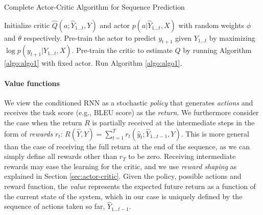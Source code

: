 \documentclass{article} %
\begin{document}
\begin{algorithm}
    \caption{Complete Actor-Critic Algorithm for Sequence Prediction}
    \label{algo:algo2}
    \begin{algorithmic}[1]
    \STATE 
        Initialize critic $\hat{Q}(a;\hat{Y}_{1 \ldots t}, Y)$
        and actor $p(a|\hat{Y}_{1 \ldots t}, X)$ with
        random weights $\phi$ and $\theta$ respectively.
    \STATE 
        Pre-train the actor to predict $y_{t+1}$ given 
        $Y_{1 \ldots t}$ by maximizing 
        $\log p(y_{t+1}|Y_{1 \ldots t}, X)$.
    \STATE 
        Pre-train the critic to estimate $Q$ by running Algorithm \ref{algo:algo1}
        with fixed actor.
    \STATE
        Run Algorithm \ref{algo:algo1}.
    \end{algorithmic}
\end{algorithm}



\paragraph{Value functions}

We view the conditioned RNN as a stochastic \textit{policy}
that generates \textit{actions}
and receives the task score (e.g., BLEU score)  as the \textit{return}.  
We furthermore consider the case when
the return $R$ is partially received at the intermediate steps 
in the form of \textit{rewards} $r_t$:  $R(\hat{Y}, Y) =
\sum_{t=1}^T r_t(\hat{y}_t;\hat{Y}_{1 \ldots t-1}, Y)$.  This
is more general than the case of receiving the full return at the end of the sequence, 
as we can simply define all rewards other than $r_T$ to be zero.
Receiving intermediate rewards may ease the learning for the critic, and we use
\emph{reward shaping} as explained in Section \ref{sec:actor-critic}. 
Given the policy, possible actions and reward function, the \emph{value} represents the
expected future return as a function of the
current state of the system, which in our case is uniquely defined by the
sequence of actions taken so far, $\hat{Y}_{1 \ldots t-1}$.
\end{document}
